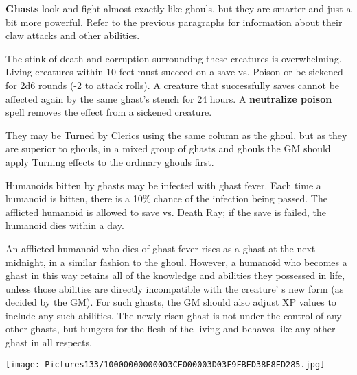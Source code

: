\documentclass[a4paper,twoside,openany,10pt]{book}
\begin{document}
\begin{multicols}{2}
\textbf{Ghasts} look and fight almost exactly like ghouls, but they are smarter and just a bit more powerful. Refer to the previous paragraphs for information about their claw attacks and other abilities.

The stink of death and corruption surrounding these creatures is overwhelming. Living creatures within 10 feet must succeed on a save vs. Poison or be sickened for 2d6 rounds (-2 to attack rolls). A creature that successfully saves cannot be affected again by the same ghast's stench for 24 hours. A \textbf{neutralize poison} spell removes the effect from a sickened creature.

They may be Turned by Clerics using the same column as the ghoul, but as they are superior to ghouls, in a mixed group of ghasts and ghouls the GM should apply Turning effects to the ordinary ghouls first.

Humanoids bitten by ghasts may be infected with ghast fever. Each time a humanoid is bitten, there is a 10\% chance of the infection being passed. The afflicted humanoid is allowed to save vs. Death Ray; if the save is failed, the humanoid dies within a day.

An afflicted humanoid who dies of ghast fever rises as a ghast at the next midnight, in a similar fashion to the ghoul. However, a humanoid who becomes a ghast in this way retains all of the knowledge and abilities they possessed in life, unless those abilities are directly incompatible with the creature' s new form (as decided by the GM). For such ghasts, the GM should also adjust XP values to include any such abilities. The newly-risen ghast is not under the control of any other ghasts, but hungers for the flesh of the living and behaves like any other ghast in all respects.

\end{multicols}

\begin{center}
	\texttt{[image: Pictures133/10000000000003CF000003D03F9FBED38E8ED285.jpg]}
\end{center}
\end{document}
